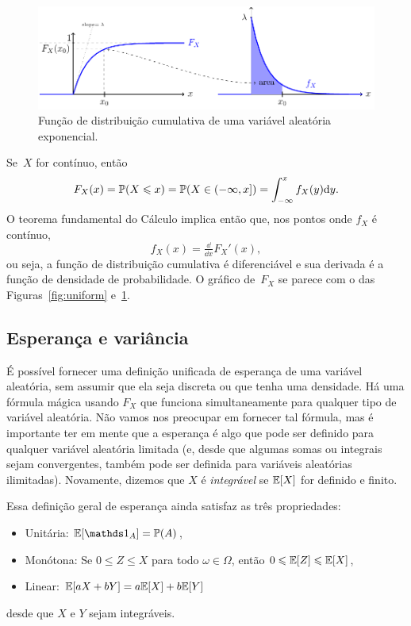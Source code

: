 \begin{figure}[b]
\includegraphics[width=\textwidth]{Pictures/exponential}
\caption{Função de distribuição cumulativa de uma variável aleatória exponencial.}
\label{fig:exponential}
\end{figure}

Se~$X$ for contínuo, então
\[F_X(x) = \mathbb{P}(X \leqslant x) = \mathbb{P}(X \in (-\infty,x]) = \int_{-\infty}^x f_X(y)\mathrm{d} y.\]
O teorema fundamental do Cálculo implica então que, nos pontos onde $ f_X $ é contínuo,
\[
f_X(x) = \tfrac{\dd}{\dd x} F_X'(x)
,
\]
ou seja, a função de distribuição cumulativa é diferenciável e sua derivada é a função de densidade de probabilidade.
O gráfico de~$F_X$ se parece com o das Figuras~\ref{fig:uniform} e~\ref{fig:exponential}.


\subsection{Esperança e variância}

É possível fornecer uma definição unificada de esperança de uma variável aleatória, sem assumir que ela seja discreta ou que tenha uma densidade.
Há uma fórmula mágica usando $ F_X $ que funciona simultaneamente para qualquer tipo de variável aleatória.
Não vamos nos preocupar em fornecer tal fórmula, mas é importante ter em mente que a esperança é algo que pode ser definido para qualquer variável aleatória limitada (e, desde que algumas somas ou integrais sejam convergentes, também pode ser definida para variáveis aleatórias ilimitadas).
Novamente, dizemos que $ X $ é \emph{integrável} se $ \mathbb{E}[X] $ for definido e finito.

Essa definição geral de esperança ainda satisfaz as três propriedades:
\begin{itemize}
\item
Unitária: $ \E[\I_A] = \Pb(A) $,
\item
Monótona:
Se $ 0 \leq Z \leq X $ para todo $ \omega\in\Omega $, então $ 0 \leqslant \mathbb{E}[Z] \leqslant \mathbb{E}[X] $,
\item
Linear: $ \mathbb{E}[aX+bY]=a\mathbb{E}[X]+b\mathbb{E}[Y] $
\end{itemize}
desde que $ X $ e $ Y $ sejam integráveis.

